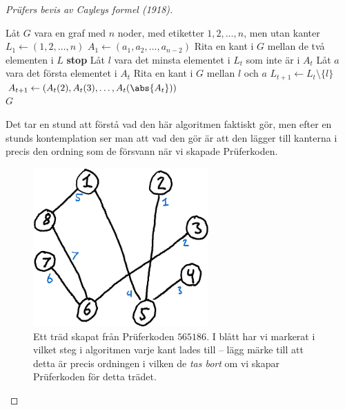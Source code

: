 \documentclass[nobib]{tufte-handout}
\begin{document}
\begin{proof}[Prüfers bevis av Cayleys formel (1918)]
    \begin{algorithm}
        \caption{Konstruktion av träd från Prüferkoder}\label{alg:constr_tree_from_prufer_code}
        \begin{algorithmic}
            \State Låt $G$ vara en graf med $n$ noder, med etiketter $1, 2, \ldots, n$, men utan kanter
            \State $L_1 \gets (1, 2, \ldots, n)$
            \State $A_1 \gets (a_1, a_2, \ldots, a_{n-2})$
            \State Rita en kant i $G$ mellan de två elementen i $L$
            \State \textbf{stop}
            \Else
            \State Låt $l$ vara det minsta elementet i $L_t$ som inte är i $A_t$
            \State Låt $a$ vara det första elementet i $A_t$
            \State Rita en kant i $G$ mellan $l$ och $a$
            \State $L_{t+1} \gets L_t \setminus \{l\}$
            \State $A_{t+1} \gets (A_t(2), A_t(3), \ldots, A_t(\abs{A_t}))$
            \EndIf
            \EndFor\\
            \Return $G$
        \end{algorithmic}
    \end{algorithm}

    Det tar en stund att förstå vad den här algoritmen faktiskt gör, men efter en stunds kontemplation ser man att vad den gör är att den lägger till kanterna i precis den ordning som de försvann när vi skapade Prüferkoden.

    \begin{figure}
        \centering
        \includegraphics[width=0.6\textwidth]{graphics/tree_from_prufer_code.png}
        \caption{Ett träd skapat från Prüferkoden $565186$. I blått har vi markerat i vilket steg i algoritmen varje kant lades till -- lägg märke till att detta är precis ordningen i vilken de \emph{tas bort} om vi skapar Prüferkoden för detta trädet.} 
    \end{figure}


\end{proof}
\end{document}
